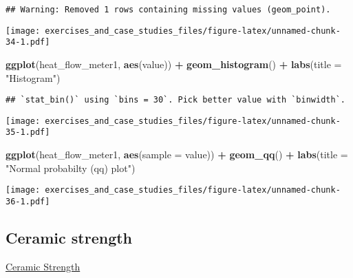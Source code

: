 \documentclass[]{book}
\newenvironment{Shaded}{\begin{snugshade}}{\end{snugshade}}
\newcommand{\DataTypeTok}[1]{\textcolor[rgb]{0.13,0.29,0.53}{#1}}
\newcommand{\DecValTok}[1]{\textcolor[rgb]{0.00,0.00,0.81}{#1}}
\newcommand{\KeywordTok}[1]{\textcolor[rgb]{0.13,0.29,0.53}{\textbf{#1}}}
\newcommand{\NormalTok}[1]{#1}
\newcommand{\OperatorTok}[1]{\textcolor[rgb]{0.81,0.36,0.00}{\textbf{#1}}}
\newcommand{\OtherTok}[1]{\textcolor[rgb]{0.56,0.35,0.01}{#1}}
\newcommand{\StringTok}[1]{\textcolor[rgb]{0.31,0.60,0.02}{#1}}
\theoremstyle{definition}
\theoremstyle{definition}
\theoremstyle{definition}
\theoremstyle{remark}
\begin{document}
\begin{verbatim}
## Warning: Removed 1 rows containing missing values (geom_point).
\end{verbatim}

\texttt{[image: exercises\_and\_case\_studies\_files/figure-latex/unnamed-chunk-34-1.pdf]}

\begin{Shaded}
\begin{Highlighting}[]
\KeywordTok{ggplot}\NormalTok{(heat_flow_meter1, }\KeywordTok{aes}\NormalTok{(value)) }\OperatorTok{+}
\StringTok{  }\KeywordTok{geom_histogram}\NormalTok{() }\OperatorTok{+}
\StringTok{  }\KeywordTok{labs}\NormalTok{(}\DataTypeTok{title =} \StringTok{"Histogram"}\NormalTok{)}
\end{Highlighting}
\end{Shaded}

\begin{verbatim}
## `stat_bin()` using `bins = 30`. Pick better value with `binwidth`.
\end{verbatim}

\texttt{[image: exercises\_and\_case\_studies\_files/figure-latex/unnamed-chunk-35-1.pdf]}

\begin{Shaded}
\begin{Highlighting}[]
\KeywordTok{ggplot}\NormalTok{(heat_flow_meter1, }\KeywordTok{aes}\NormalTok{(}\DataTypeTok{sample =}\NormalTok{ value)) }\OperatorTok{+}
\StringTok{  }\KeywordTok{geom_qq}\NormalTok{() }\OperatorTok{+}
\StringTok{  }\KeywordTok{labs}\NormalTok{(}\DataTypeTok{title =} \StringTok{"Normal probabilty (qq) plot"}\NormalTok{)}
\end{Highlighting}
\end{Shaded}

\texttt{[image: exercises\_and\_case\_studies\_files/figure-latex/unnamed-chunk-36-1.pdf]}

\hypertarget{ceramic-strength}{%
\subsection{Ceramic strength}\label{ceramic-strength}}

\href{https://www.itl.nist.gov/div898/handbook/eda/section4/eda42a.htm}{Ceramic
Strength}

\begin{Shaded}
\end{Shaded}
\end{document}
